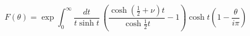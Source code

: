 \begin{equation}
F(\theta)=\exp\int_{0}^{\infty}\frac{dt}{t\sinh t}\,\left(  \frac{\cosh
(\frac{1}{2}+\nu)t}{\cosh\frac{1}{2}t}-1\right)  \cosh t\left(  1-\frac
{\theta}{i\pi}\right)  \label{3.6}%
\end{equation}

